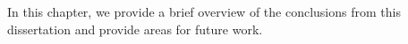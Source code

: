 In this chapter, we provide a brief overview of the conclusions from this dissertation and provide areas for future work.